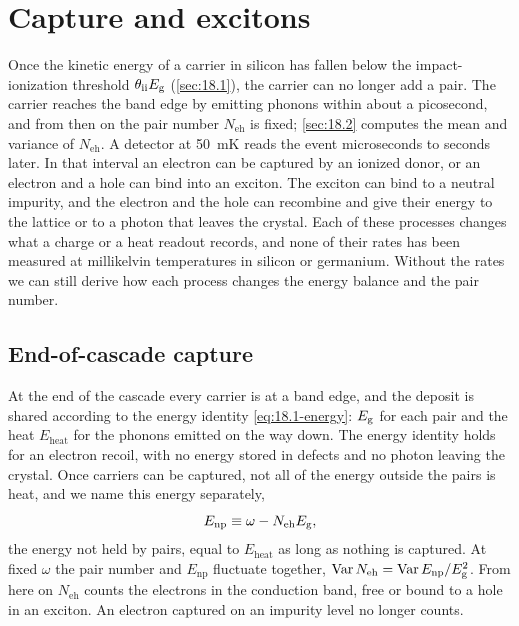 \section{Capture and excitons}\label{sec:18.5}

Once the kinetic energy of a carrier in silicon has fallen below the impact-ionization threshold $\theta_{\mathrm{ii}}E_{\mathrm{g}}$ (\cref{sec:18.1}), the carrier can no longer add a pair. The carrier reaches the band edge by emitting phonons within about a picosecond, and from then on the pair number $N_{\mathrm{eh}}$ is fixed; \cref{sec:18.2} computes the mean and variance of $N_{\mathrm{eh}}$. A detector at \SI{50}{mK} reads the event microseconds to seconds later. In that interval an electron can be captured by an ionized donor, or an electron and a hole can bind into an exciton. The exciton can bind to a neutral impurity, and the electron and the hole can recombine and give their energy to the lattice or to a photon that leaves the crystal. Each of these processes changes what a charge or a heat readout records, and none of their rates has been measured at millikelvin temperatures in silicon or germanium. Without the rates we can still derive how each process changes the energy balance and the pair number.

\subsection{End-of-cascade capture}\label{sec:18.5-capture}

At the end of the cascade every carrier is at a band edge, and the deposit is shared according to the energy identity \cref{eq:18.1-energy}: $E_{\mathrm{g}}$ for each pair and the heat $E_{\mathrm{heat}}$ for the phonons emitted on the way down. The energy identity holds for an electron recoil, with no energy stored in defects and no photon leaving the crystal. Once carriers can be captured, not all of the energy outside the pairs is heat, and we name this energy separately,
\begin{equation}
  E_{\mathrm{np}} \equiv \omega - N_{\mathrm{eh}}E_{\mathrm{g}} ,
  \label{eq:18.5-Enp}
\end{equation}
the energy not held by pairs, equal to $E_{\mathrm{heat}}$ as long as nothing is captured. At fixed $\omega$ the pair number and $E_{\mathrm{np}}$ fluctuate together, $\operatorname{Var}N_{\mathrm{eh}} = \operatorname{Var}E_{\mathrm{np}}/E_{\mathrm{g}}^2$. From here on $N_{\mathrm{eh}}$ counts the electrons in the conduction band, free or bound to a hole in an exciton. An electron captured on an impurity level no longer counts.

